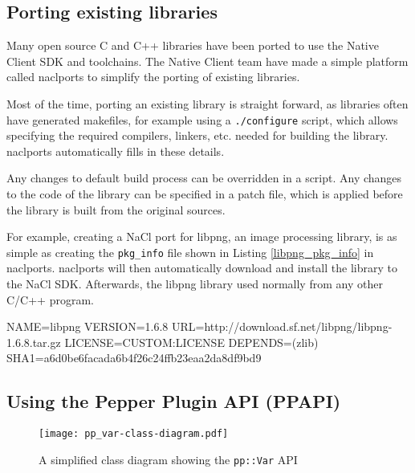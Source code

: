 
\subsection{Porting existing libraries} %
\label{sub:naclports}
Many open source C and C++ libraries have been ported to use the Native Client SDK and toolchains. The Native Client team have made a simple platform called naclports to simplify the porting of existing libraries. 

Most of the time, porting an existing library is straight forward, as libraries often have generated makefiles, for example using a \lstinline+./configure+ script, which allows specifying the required compilers, linkers, etc. needed for building the library. naclports automatically fills in these details. 

Any changes to default build process can be overridden in a script. Any changes to the code of the library can be specified in a patch file, which is applied before the library is built from the original sources.

For example, creating a NaCl port for libpng, an image processing library, is as simple as creating the \lstinline+pkg_info+ file shown in Listing \ref{libpng_pkg_info} in naclports. naclports will then automatically download and install the library to the NaCl SDK. Afterwards, the libpng library used normally from any other C/C++ program.

\begin{code}
NAME=libpng
VERSION=1.6.8
URL=http://download.sf.net/libpng/libpng-1.6.8.tar.gz
LICENSE=CUSTOM:LICENSE
DEPENDS=(zlib)
SHA1=a6d0be6facada6b4f26c24ffb23eaa2da8df9bd9
\end{code}


\subsection{Using the Pepper Plugin API (PPAPI)} %
\label{sub:using_PPAPI}
\begin{figure}
    \centering
    \texttt{[image: pp\_var-class-diagram.pdf]} 
    \caption{A simplified class diagram showing the \lstinline{pp::Var} API}
    \label{fig:pp_var_api}
\end{figure}

